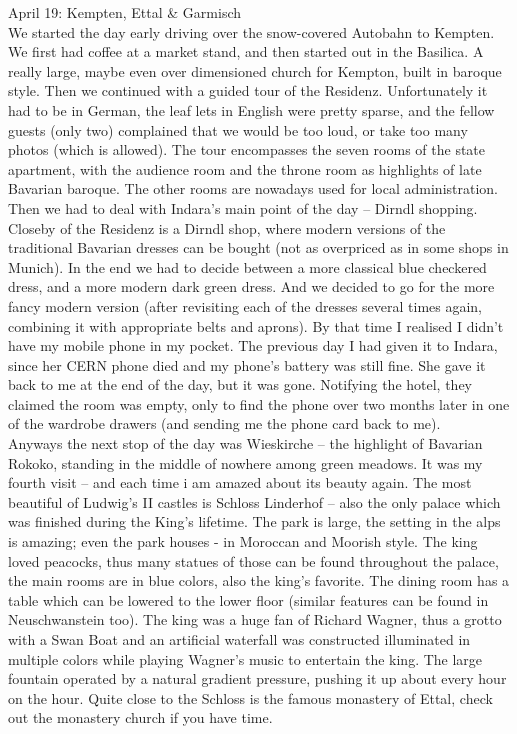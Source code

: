 April 19: Kempten, Ettal \& Garmisch\\
We started the day early driving over the snow-covered Autobahn to Kempten. We first had coffee at a market stand, and then started out in the Basilica. A really large, maybe even over dimensioned church for Kempton, built in baroque style. Then we continued with a guided tour of the Residenz. Unfortunately it had to be in German, the leaf lets in English were pretty sparse, and the fellow guests (only two) complained that we would be too loud, or take too many photos (which is allowed). The tour encompasses the seven rooms of the state apartment, with the audience room and the throne room as highlights of late Bavarian baroque. The other rooms are nowadays used for local administration.\\
Then we had to deal with Indara's main point of the day -- Dirndl shopping. Closeby of the Residenz is a Dirndl shop, where modern versions of the traditional Bavarian dresses can be bought (not as overpriced as in some shops in Munich). In the end we had to decide between a more classical blue checkered dress, and a more modern dark green dress. And we decided to go for the more fancy modern version (after revisiting each of the dresses several times again, combining it with appropriate belts and aprons). By that time I realised I didn't have my mobile phone in my pocket. The previous day I had given it to Indara, since her CERN phone died and my phone's battery was still fine. She gave it back to me at the end of the day, but it was gone. Notifying the hotel, they claimed the room was empty, only to find the phone over two months later in one of the wardrobe drawers (and sending me the phone card back to me).\\
Anyways the next stop of the day was Wieskirche -- the highlight of Bavarian Rokoko, standing in the middle of nowhere among green meadows. It was my fourth visit -- and each time i am amazed about its beauty again. The most beautiful of Ludwig's II castles is Schloss Linderhof -- also the only palace which was finished during the King's lifetime. The park is large, the setting in the alps is amazing; even the park houses - in Moroccan and Moorish style. The king loved peacocks, thus many statues of those can be found throughout the palace, the main rooms are in blue colors, also the king's favorite. The dining room has a table which can be lowered to the lower floor (similar features can be found in Neuschwanstein too). The king was a huge fan of Richard Wagner, thus a grotto with a Swan Boat and an artificial waterfall was constructed illuminated in multiple colors while playing Wagner's music to entertain the king. The large fountain operated by a natural gradient pressure, pushing it up about every hour on the hour. Quite close to the Schloss is the famous monastery of Ettal, check out the monastery church if you have time.\\ 
